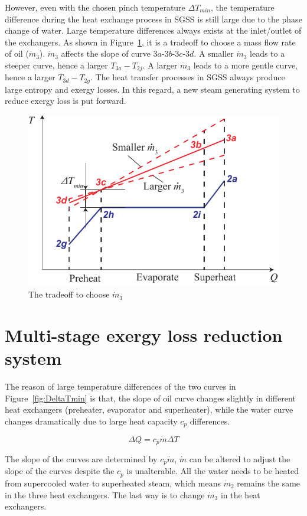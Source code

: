 However, even with the chosen pinch temperature $\Delta T_{min}$, the temperature difference during the heat exchange process in SGSS is still large due to the phase change of water. Large temperature differences always exists at the inlet/outlet of the exchangers. As shown in Figure~\ref{fig:DeltaT}, it is a tradeoff to choose a mass flow rate of oil ($\dot{m}_3$). $\dot{m}_3$ affects the slope of curve $3a$-$3b$-$3c$-$3d$. A smaller $\dot{m}_3$ leads to a steeper curve, hence a larger $T_{3a} - T_{2j}$. A larger $\dot{m}_3$ leads to a more gentle curve, hence a larger $T_{3d} - T_{2g}$. The heat transfer processes in SGSS always produce large entropy and exergy losses. In this regard, a new steam generating system to reduce exergy loss is put forward.

\noindent \begin{figure}[htbp]
\begin{center}
	\includegraphics[width = 0.7\columnwidth]{fig/DeltaT}
	\caption{The tradeoff to choose $\dot{m}_3$}
	\label{fig:DeltaT}
\end{center}
\end{figure}

\section{Multi-stage exergy loss reduction system}\label{sec:melrs}
The reason of large temperature differences of the two curves in Figure~\ref{fig:DeltaTmin} is that, the slope of oil curve changes slightly in different heat exchangers (preheater, evaporator and superheater), while the water curve changes dramatically due to large heat capacity $c_p$ differences.

\begin{equation}
  \Delta Q =  c_p\dot{m} \Delta T
\end{equation}

The slope of the curves are determined by $c_p\dot{m}$, $\dot{m}$ can be altered to adjust the slope of the curves despite the $c_p$ is unalterable. All the water needs to be heated from supercooled water to superheated steam, which means $\dot{m}_2$ remains the same in the three heat exchangers. The last way is to change $\dot{m}_3$ in the heat exchangers.

